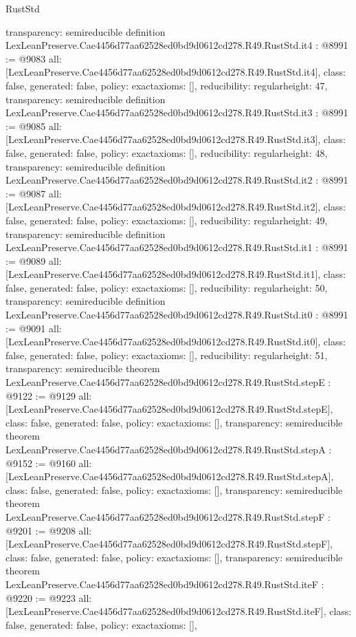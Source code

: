 \begin{lexlean}{RustStd}
\begin{coremodule}
{  transparency: semireducible
}
definition LexLeanPreserve.Cae4456d77aa62528ed0bd9d0612cd278.R49.RustStd.it4 : @8991 := @9083 {
  all: [LexLeanPreserve.Cae4456d77aa62528ed0bd9d0612cd278.R49.RustStd.it4],
  class: false,
  generated: false,
  policy: exact{axioms: []},
  reducibility: regular{height: 47},
  transparency: semireducible
}
definition LexLeanPreserve.Cae4456d77aa62528ed0bd9d0612cd278.R49.RustStd.it3 : @8991 := @9085 {
  all: [LexLeanPreserve.Cae4456d77aa62528ed0bd9d0612cd278.R49.RustStd.it3],
  class: false,
  generated: false,
  policy: exact{axioms: []},
  reducibility: regular{height: 48},
  transparency: semireducible
}
definition LexLeanPreserve.Cae4456d77aa62528ed0bd9d0612cd278.R49.RustStd.it2 : @8991 := @9087 {
  all: [LexLeanPreserve.Cae4456d77aa62528ed0bd9d0612cd278.R49.RustStd.it2],
  class: false,
  generated: false,
  policy: exact{axioms: []},
  reducibility: regular{height: 49},
  transparency: semireducible
}
definition LexLeanPreserve.Cae4456d77aa62528ed0bd9d0612cd278.R49.RustStd.it1 : @8991 := @9089 {
  all: [LexLeanPreserve.Cae4456d77aa62528ed0bd9d0612cd278.R49.RustStd.it1],
  class: false,
  generated: false,
  policy: exact{axioms: []},
  reducibility: regular{height: 50},
  transparency: semireducible
}
definition LexLeanPreserve.Cae4456d77aa62528ed0bd9d0612cd278.R49.RustStd.it0 : @8991 := @9091 {
  all: [LexLeanPreserve.Cae4456d77aa62528ed0bd9d0612cd278.R49.RustStd.it0],
  class: false,
  generated: false,
  policy: exact{axioms: []},
  reducibility: regular{height: 51},
  transparency: semireducible
}
theorem LexLeanPreserve.Cae4456d77aa62528ed0bd9d0612cd278.R49.RustStd.stepE : @9122 := @9129 {
  all: [LexLeanPreserve.Cae4456d77aa62528ed0bd9d0612cd278.R49.RustStd.stepE],
  class: false,
  generated: false,
  policy: exact{axioms: []},
  transparency: semireducible
}
theorem LexLeanPreserve.Cae4456d77aa62528ed0bd9d0612cd278.R49.RustStd.stepA : @9152 := @9160 {
  all: [LexLeanPreserve.Cae4456d77aa62528ed0bd9d0612cd278.R49.RustStd.stepA],
  class: false,
  generated: false,
  policy: exact{axioms: []},
  transparency: semireducible
}
theorem LexLeanPreserve.Cae4456d77aa62528ed0bd9d0612cd278.R49.RustStd.stepF : @9201 := @9208 {
  all: [LexLeanPreserve.Cae4456d77aa62528ed0bd9d0612cd278.R49.RustStd.stepF],
  class: false,
  generated: false,
  policy: exact{axioms: []},
  transparency: semireducible
}
theorem LexLeanPreserve.Cae4456d77aa62528ed0bd9d0612cd278.R49.RustStd.iteF : @9220 := @9223 {
  all: [LexLeanPreserve.Cae4456d77aa62528ed0bd9d0612cd278.R49.RustStd.iteF],
  class: false,
  generated: false,
  policy: exact{axioms: []},
}
\end{coremodule}
\end{lexlean}
